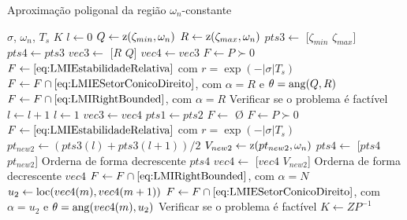 \begin{algorithm}[!ht]
  \caption{Aproximação poligonal da região $\omega_n$-constante}\label{alg:AproximacaoPoligonalWn}
  \begin{algorithmic}[1]
    \Require $\sigma$, $\omega_n$, $T_s$
    \Ensure $K$
    \State $l \gets 0$
    \State $Q \gets \operatorname{\mathrm{z}}(\zeta_{min},\omega_n)$
    \State $R \gets \operatorname{\mathrm{z}}(\zeta_{max},\omega_n)$
    \State $pts3 \gets$ [$\zeta_{min}$ $\zeta_{max}$]
    \State $pts4 \gets pts3$
    \State $vec3 \gets$ [$R$ $Q$]
    \State $vec4 \gets vec3$
    \State $F \gets P \succ 0$
    \State $F \gets \eqref{eq:LMIEstabilidadeRelativa}$ com $r = \exp{\left(-|\sigma|T_s\right)}$ 
    \State $F \gets F \cap \eqref{eq:LMIESetorConicoDireito}$, com $\alpha = R$ e $\theta = \operatorname{ang}(Q,R)$ 
    \State $F \gets F \cap \eqref{eq:LMIRightBounded}$, com $\alpha = R$ 
    \State Verificar se o problema é factível
        \State $l \gets l + 1$
      \Else
        \State $l \gets 1$
        \State $vec3 \gets vec4$
        \State $pts1 \gets pts2$
      \EndIf
        \State $F \gets$ \O {}
        \State $F \gets P \succ 0$
        \State $F \gets \eqref{eq:LMIEstabilidadeRelativa}$ com $r = \exp{\left(-|\sigma|T_s\right)}$ 
        \State $pt_{new2} \gets (pts3(l)+pts3(l+1))/2$
        \State $V_{new2} \gets \operatorname{\mathrm{z}}(pt_{new2}, \omega_n)$
        \State $pts4 \gets$ [$pts4$ $pt_{new2}$]
        \State Orderna de forma decrescente $pts4$
        \State $vec4 \gets$ [$vec4$ $V_{new2}$]
        \State Orderna de forma decrescente $vec4$
        \State $F \gets F \cap \eqref{eq:LMIRightBounded}$, com $\alpha = N$ 
          \State $u_2 \gets \operatorname{loc}(vec4(m),vec4(m+1))$
          \State $F \gets F \cap \eqref{eq:LMIESetorConicoDireito}$, com $\alpha = u_2$ e $\theta = \operatorname{ang}(vec4(m),u_2)$
        \EndFor
        \State Verificar se o problema é factível
    \EndWhile
    \State $K \gets ZP^{-1}$
  \end{algorithmic}
\end{algorithm}
